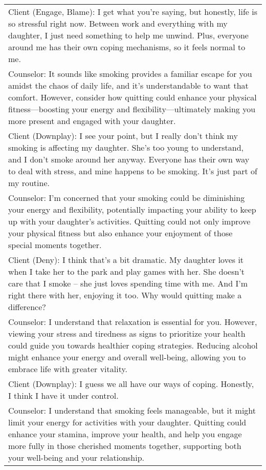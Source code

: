 \begin{table*}[htbp]
\begin{tabularx}{\textwidth}{X}
Client ({\color{red}Engage}, {\color{green} Blame}): {\color{red} I get what you're saying, but honestly, life is so stressful right now. Between work and everything with my daughter, I just need something to help me unwind.} {\color{green} Plus, everyone around me has their own coping mechanisms, so it feels normal to me.}                                                                 \\
Counselor: It sounds like smoking provides a familiar escape for you amidst the chaos of daily life, and it’s understandable to want that comfort. However, consider how quitting could enhance your physical fitness—boosting your energy and flexibility—ultimately making you more present and engaged with your daughter. \\
Client (Downplay): I see your point, but I really don't think my smoking is affecting my daughter. She's too young to understand, and I don't smoke around her anyway. Everyone has their own way to deal with stress, and mine happens to be smoking. It’s just part of my routine.                                                  \\
Counselor: I’m concerned that your smoking could be diminishing your energy and flexibility, potentially impacting your ability to keep up with your daughter’s activities. Quitting could not only improve your physical fitness but also enhance your enjoyment of those special moments together.                          \\
Client (Deny): I think that's a bit dramatic. My daughter loves it when I take her to the park and play games with her. She doesn't care that I smoke – she just loves spending time with me. And I'm right there with her, enjoying it too. Why would quitting make a difference?                                                \\
Counselor: I understand that relaxation is essential for you. However, viewing your stress and tiredness as signs to prioritize your health could guide you towards healthier coping strategies. Reducing alcohol might enhance your energy and overall well-being, allowing you to embrace life with greater vitality.       \\
Client (Downplay): I guess we all have our ways of coping. Honestly, I think I have it under control.                                                                          \\
Counselor: I understand that smoking feels manageable, but it might limit your energy for activities with your daughter. Quitting could enhance your stamina, improve your health, and help you engage more fully in those cherished moments together, supporting both your well-being and your relationship.                 \\

\end{tabularx}
\end{table*}

